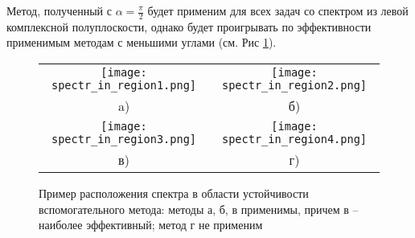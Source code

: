 \documentclass[a4paper, 14pt]{extreport} %
\begin{document}
 Метод, полученный с $\alpha = \frac{\pi}{2}$ будет применим для всех задач со спектром из левой комплексной полуплоскости, однако будет проигрывать по эффективности применимым методам с меньшими углами  (см. Рис \ref{spectr_in_regionn}).
\begin{figure}
\begin{center}
\begin{tabular}{cc}

\texttt{[image: spectr\_in\_region1.png]}&\texttt{[image: spectr\_in\_region2.png]}\\
\small{ a)} & \small{ б)}\\

\texttt{[image: spectr\_in\_region3.png]}&\texttt{[image: spectr\_in\_region4.png]}\\
\small в) &\small г)
\end{tabular}
\caption{\small Пример расположения спектра в области устойчивости вспомогательного метода: методы а, б, в применимы, причем в -- наиболее эффективный; метод г не применим }
\label{spectr_in_regionn}
\end{center}
\end{figure}
\end{document}
